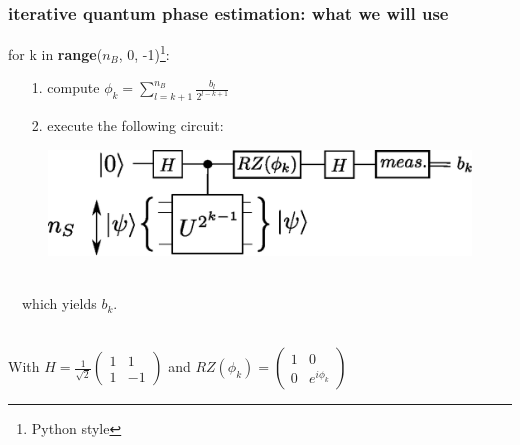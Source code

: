 \documentclass{beamer}
\begin{document}
\begin{frame}
\frametitle{iterative quantum phase estimation: what we will use}

{\selectfont for k in \textbf{range}($n_{B}$, 0, -1)\footnote{Python style}:
\begin{itemize}
\item[1.] compute $\phi_{k}=\sum_{l=k+1}^{n_{B}} \frac{b_{l}}{2^{l-k+1}}$
\item[2.] execute the following circuit: 
\end{itemize}
\begin{figure}
\includegraphics[width=.6\textwidth]{iterative_pea.eps}
\end{figure}~\\
$\quad$which yields $b_{k}$.\\~\\
}

With $H=\frac{1}{\sqrt{2}}\begin{pmatrix}1 & 1 \\ 1 & -1 \end{pmatrix}$ and 
$RZ(\phi_{k})=\begin{pmatrix} 1 & 0 \\ 0 & e^{i\phi_{k}}\end{pmatrix}$

\end{frame}
\end{document}
